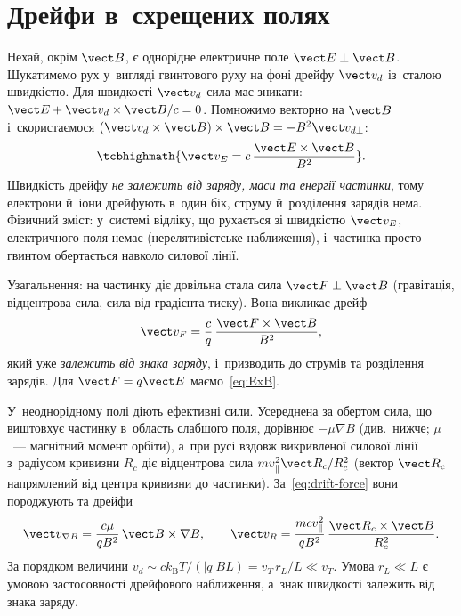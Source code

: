 \section{Дрейфи в~схрещених полях}



Нехай, окрім $\vect B$, є однорідне електричне поле $\vect E\perp\vect B$. Шукатимемо рух
у~вигляді гвинтового руху на фоні дрейфу $\vect v_d$ із~сталою швидкістю. Для швидкості
$\vect v_d$ сила має зникати: $\vect E+\vect v_d\times\vect B/c=0$. Помножимо векторно на
$\vect B$ і~скористаємося $(\vect v_d\times\vect B)\times\vect B=-B^2\vect v_{d\perp}$:
\begin{equation}\label{eq:ExB}
	\tcbhighmath{\vect v_E=c\,\frac{\vect E\times\vect B}{B^2}}.
\end{equation}
Швидкість дрейфу \emph{не залежить від заряду, маси та енергії частинки}, тому електрони
й~іони дрейфують в~один бік, струму й~розділення зарядів нема. Фізичний зміст: у~системі
відліку, що рухається зі швидкістю $\vect v_E$, електричного поля немає (нерелятивістське
наближення), і~частинка просто гвинтом обертається навколо силової лінії.

Узагальнення: на частинку діє довільна стала сила $\vect F\perp\vect B$ (гравітація,
відцентрова сила, сила від градієнта тиску). Вона викликає дрейф
\begin{equation}\label{eq:drift-force}
	\vect v_F=\frac{c}{q}\,\frac{\vect F\times\vect B}{B^2},
\end{equation}
який уже \emph{залежить від знака заряду}, і~призводить до струмів та розділення зарядів.
Для $\vect F=q\vect E$ маємо~\eqref{eq:ExB}.

У~неоднорідному полі діють ефективні сили. Усереднена за обертом сила, що виштовхує
частинку в~область слабшого поля, дорівнює $-\mu\nabla B$ (див.~нижче; $\mu$~--- магнітний
момент орбіти), а~при русі вздовж викривленої силової лінії з~радіусом кривизни $R_c$ діє
відцентрова сила $mv_\parallel^2\vect R_c/R_c^2$ (вектор $\vect R_c$ напрямлений від
центра кривизни до частинки). За~\eqref{eq:drift-force} вони породжують
 та  дрейфи
\begin{equation}\label{eq:gradB-drift}
	\vect v_{\nabla B}=\frac{c\mu}{qB^2}\,\vect B\times\nabla B,\qquad
	\vect v_{R}=\frac{mcv_\parallel^2}{qB^2}\,\frac{\vect R_c\times\vect B}{R_c^2}.
\end{equation}
За порядком величини $v_d\sim ck_{\mathrm B}T/(|q|BL)=v_T\,r_L/L\ll v_T$. Умова $r_L\ll L$
є умовою застосовності дрейфового наближення, а~знак швидкості залежить від знака заряду.

